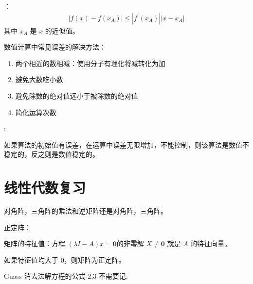 ：
\begin{align*}
	|f(x) - f(x_A)| \le |f^\prime (x_A)||x - x_A|
\end{align*}
其中 $x_A$ 是 $x$ 的近似值。

数值计算中常见误差的解决方法：
\begin{enumerate}
	\item 两个相近的数相减：使用分子有理化将减转化为加
	\item 避免大数吃小数
	\item 避免除数的绝对值远小于被除数的绝对值
	\item 简化运算次数
\end{enumerate}

:

如果算法的初始值有误差，在运算中误差无限增加，不能控制，则该算法是数值不稳定的，反之则是数值稳定的。

\section{线性代数复习}

对角阵，三角阵的乘法和逆矩阵还是对角阵，三角阵。

正定阵：

矩阵的特征值：方程 $(\lambda I-A)x = \boldsymbol{0}$的非零解 $X\ne\boldsymbol{0}$ 就是 $A$ 的特征向量。

如果特征值均大于 $0$，则矩阵为正定阵。

Guass 消去法解方程的公式 2.3 不需要记.
